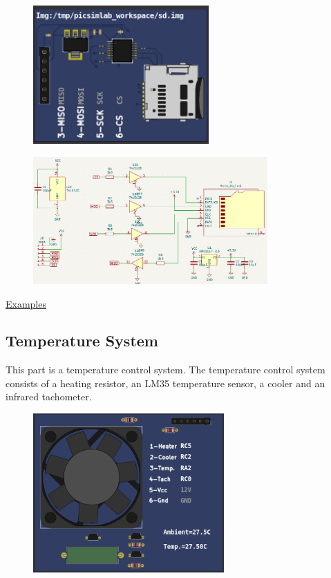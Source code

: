 \begin{figure}[H]
\center
\includegraphics[width=0.6\textwidth]{img/part_sdcard.png} 
\end{figure} 

\begin{figure}[H]
\center
\includegraphics[width=0.8\textwidth]{img/part_sdcard_.png} 
\end{figure} 


\href{https://lcgamboa.github.io/picsimlab_examples/parts_SD_Card.html}{Examples}


\subsection{Temperature System}

This part is a temperature control system. 
The temperature control system consists of a heating resistor, an LM35 temperature sensor, 
a cooler and an infrared tachometer.


\begin{figure}[H]
\center
\includegraphics[width=0.65\textwidth]{img/part_tempsys.png} 
\end{figure}

